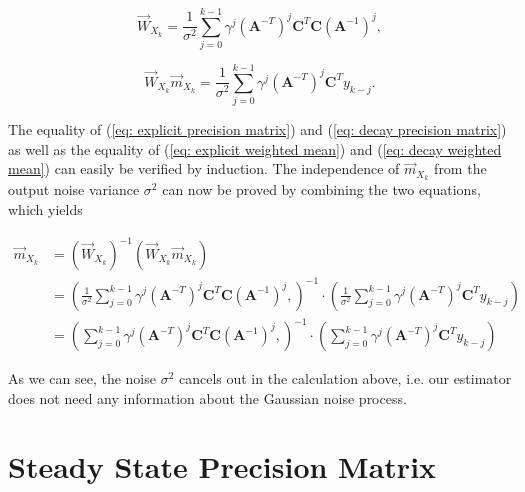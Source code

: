 \documentclass[11pt,a4paper,twoside]{report}
\newcommand{\messF}[3]{\overrightarrow{#1}_{{#2}_{k{#3}}}}
\newcommand{\mat}[1]{\mathbf{#1}}
\begin{document}
\begin{equation}
	\label{eq: explicit precision matrix}
	\messF{W}{X}{} = \frac{1}{\sigma^2}\sum_{j=0}^{k-1}\gamma^{j}\left(\mat{A}^{-T}\right)^j\mat{C}^T\mat{C}\left(\mat{A}^{-1}\right)^{j},
\end{equation}

\begin{equation}
	\label{eq: explicit weighted mean}
	\messF{W}{X}{}\messF{m}{X}{} = \frac{1}{\sigma^2}\sum_{j=0}^{k-1}\gamma^{j} \left(\mat{A}^{-T}\right)^j\mat{C}^T y_{k-j}.
\end{equation}

The equality of (\ref{eq: explicit precision matrix}) and (\ref{eq: decay precision matrix}) as well as the equality of (\ref{eq: explicit weighted mean}) and (\ref{eq: decay weighted mean}) can easily be verified by induction. The independence of $\messF{m}{X}{}$ from the output noise variance $\sigma^2$ can now be proved by combining the two equations, which yields

\begin{align}
	\label{eq mean independence}
	\messF{m}{X}{} &= \left( \messF{W}{X}{}\right)^{-1} \left(\messF{W}{X}{}\messF{m}{X}{}\right) \\
	&= \left(\frac{1}{\sigma^2} \sum_{j=0}^{k-1}\gamma^{j}\left(\mat{A}^{-T}\right)^j\mat{C}^T\mat{C}\left(\mat{A}^{-1}\right)^{j}, \right)^{-1} \cdot \left( \frac{1}{\sigma^2}\sum_{j=0}^{k-1}\gamma^{j} \left(\mat{A}^{-T}\right)^j\mat{C}^T y_{k-j} \right) \\
	&= \left(\sum_{j=0}^{k-1}\gamma^{j}\left(\mat{A}^{-T}\right)^j\mat{C}^T\mat{C}\left(\mat{A}^{-1}\right)^{j}, \right)^{-1} \cdot  \left(\sum_{j=0}^{k-1}\gamma^{j} \left(\mat{A}^{-T}\right)^j\mat{C}^T y_{k-j} \right)
\end{align}

As we can see, the noise $\sigma^2$ cancels out in the calculation above, i.e. our estimator does not need any information about the Gaussian noise process.
\chapter*{Steady State Precision Matrix}


\end{document}
